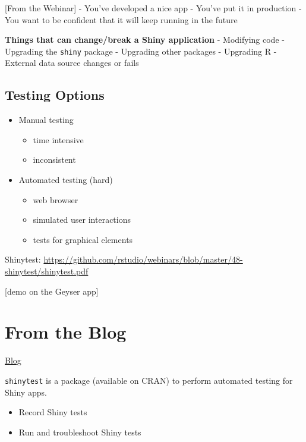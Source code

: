 \documentclass[]{book}
\providecommand{\tightlist}{%
  \setlength{\itemsep}{0pt}\setlength{\parskip}{0pt}}
\begin{document}
{[}From the Webinar{]} - You've developed a nice app - You've put it in
production - You want to be confident that it will keep running in the
future

\textbf{Things that can change/break a Shiny application} - Modifying
code - Upgrading the \texttt{shiny} package - Upgrading other packages -
Upgrading R - External data source changes or fails

\hypertarget{testing-options}{%
\subsection{Testing Options}\label{testing-options}}

\begin{itemize}
\tightlist
\item
  Manual testing

  \begin{itemize}
  \tightlist
  \item
    time intensive
  \item
    inconsistent
  \end{itemize}
\item
  Automated testing (hard)

  \begin{itemize}
  \tightlist
  \item
    web browser
  \item
    simulated user interactions
  \item
    tests for graphical elements
  \end{itemize}
\end{itemize}

Shinytest:
\url{https://github.com/rstudio/webinars/blob/master/48-shinytest/shinytest.pdf}

{[}demo on the Geyser app{]}

\hypertarget{from-the-blog}{%
\section{From the Blog}\label{from-the-blog}}

\href{https://resources.rstudio.com/rstudio-blog/shinytest-automated-testing-for-shiny-apps}{Blog}

\texttt{shinytest} is a package (available on CRAN) to perform automated
testing for Shiny apps.

\begin{itemize}
\tightlist
\item
  Record Shiny tests
\item
  Run and troubleshoot Shiny tests
\end{itemize}
\end{document}
